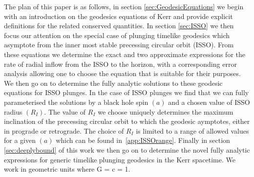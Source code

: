 \documentclass[12pt, amsmath]{revtex4-2}
\begin{document}
The plan of this paper is as follows, in section \ref{sec:GeodesicEquations} we begin with an introduction on the geodesics equations of Kerr and provide explicit definitions for the related conserved quantities. In section \ref{sec:ISSO} we then focus our attention on the special case of plunging timelike geodesics which asymptote from the inner most stable precessing circular orbit (ISSO). From these equations we determine the exact and two approximate expressions for the rate of radial inflow from the ISSO to the horizon, with a corresponding error analysis allowing one to choose the equation that is suitable for their purposes. We then go on to determine the fully analytic solutions to these geodesic equations for ISSO plunges. In the case of ISSO plunges we find that we can fully parameterised the solutions by a black hole spin $(a)$ and a chosen value of ISSO radius $(R_I)$. The value of $R_I$ we choose uniquely determines the maximum inclination of the precessing circular orbit to which the geodesic aymptotes, either in prograde or retrograde. The choice of $R_I$ is limited to a range of allowed values for a given $(a)$ which can be found in~\ref{app:ISSOrange}. Finally in section \ref{sec:deeplybound} of this work we then go on to determine the novel fully analytic expressions for generic timelike plunging geodesics in the Kerr spacetime. We work in geometric units where G = c = 1.
\end{document}
